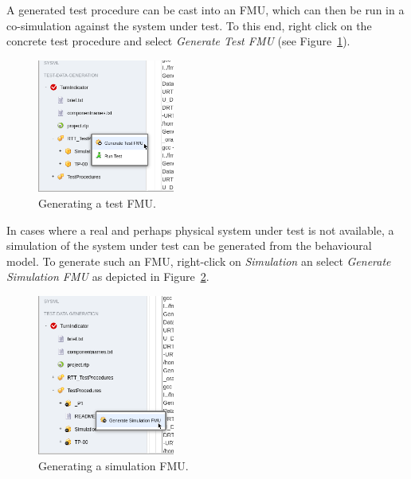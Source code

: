 A generated test procedure can be cast into an FMU, which can then be
run in a co-simulation against the system under test.
To this end, right click on the concrete test procedure and select
\emph{Generate Test FMU} (see Figure~\ref{figure:INTO-CPS-App:Generate-Test-FMU}).
%
%
%
\begin{figure}[ht]
    \centerline{\includegraphics[width=0.4\textwidth]{figures/VSI-TDG_Generate-Test-FMU}}
    \caption{Generating a test FMU.}
    \label{figure:INTO-CPS-App:Generate-Test-FMU}
\end{figure}
%
%
%
In cases where a real and perhaps physical system under test is not available,
a simulation of the system under test can be generated from the behavioural model.
To generate such an FMU, right-click on \emph{Simulation} an select
\emph{Generate Simulation FMU} as depicted in 
Figure~\ref{figure:INTO-CPS-App:Generate-Simulation}.
%
%
%
\begin{figure}[ht]
    \centerline{\includegraphics[width=0.4\textwidth]{figures/VSI-TDG_Generate-Simulation}}
    \caption{Generating a simulation FMU.}
    \label{figure:INTO-CPS-App:Generate-Simulation}
\end{figure}
%
%
%

